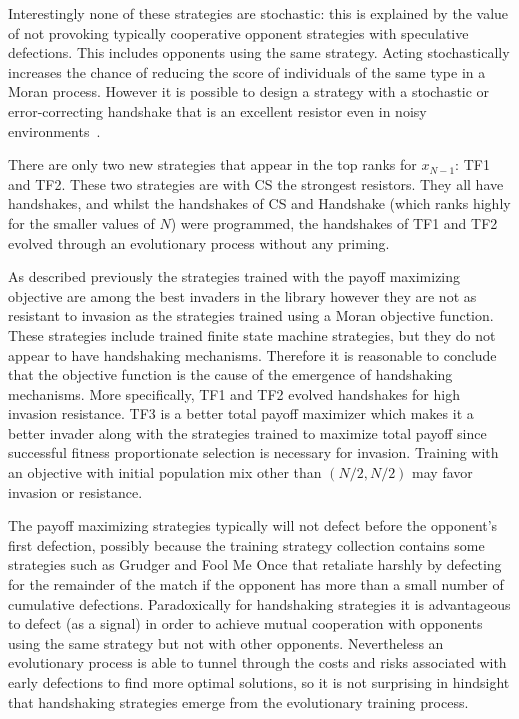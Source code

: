 \documentclass[10pt,letterpaper]{article}
\begin{document}
Interestingly none of these strategies are stochastic: this is explained by the
value of not provoking typically cooperative opponent strategies with
speculative defections. This includes opponents using the same strategy.  Acting
stochastically increases the chance of reducing the score of individuals of the
same type in a Moran process.  However it is possible to design a strategy with
a stochastic or error-correcting handshake that is an excellent resistor even in
noisy environments~\cite{Lee2015}.

There are only two new strategies that appear in the top ranks for
\(x_{N-1}\): TF1 and TF2. These two strategies are with CS the strongest
resistors. They all have handshakes, and whilst the handshakes of CS and
Handshake (which ranks highly for the smaller values of \(N\)) were
programmed, the handshakes of TF1 and TF2 evolved through an evolutionary
process without any priming.

As described previously the strategies trained with
the payoff maximizing objective are among the best invaders in the library
however they are not as resistant to invasion as the strategies trained using a
Moran objective function. These strategies include trained finite state machine
strategies, but they do not appear to have handshaking mechanisms. Therefore it
is reasonable to conclude that the objective function is the cause of the
emergence of handshaking mechanisms. More specifically, TF1 and TF2 evolved
handshakes for high invasion resistance. TF3 is a better total payoff maximizer
which makes it a better invader along with the strategies
trained to maximize total payoff since successful fitness proportionate selection
is necessary for invasion. Training with an objective with initial population
mix other than $(N/2, N/2)$ may favor invasion or resistance.

The payoff maximizing strategies typically will not defect before the opponent's
first defection, possibly because the training strategy collection contains some
strategies such as Grudger and Fool Me Once that retaliate harshly by defecting
for the remainder of the match if the opponent has more than a small number of
cumulative defections. Paradoxically for handshaking strategies
it is advantageous to defect (as a signal)
in order to achieve mutual cooperation with opponents using the same strategy
but not with other opponents. Nevertheless an evolutionary process is able to
tunnel through the costs and risks associated with early defections to find more
optimal solutions, so it is not surprising in hindsight that handshaking
strategies emerge from the evolutionary training process.
\end{document}
